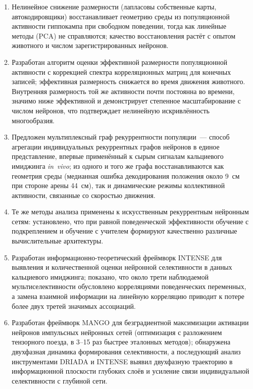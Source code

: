 \begin{enumerate}
  \item Нелинейное снижение размерности (лапласовы собственные карты, автокодировщики) восстанавливает геометрию среды из популяционной активности гиппокампа при свободном поведении, тогда как линейные методы (PCA) не справляются; качество восстановления растёт с опытом животного и числом зарегистрированных нейронов.

  \item Разработан алгоритм оценки эффективной размерности популяционной активности с коррекцией спектра корреляционных матриц для конечных записей; эффективная размерность снижается во время движения животного. Внутренняя размерность той же активности почти постоянна во времени, значимо ниже эффективной и демонстрирует степенное масштабирование с числом нейронов, что подтверждает нелинейную искривлённость многообразия.

  \item Предложен мультиплексный граф рекуррентности популяции~--- способ агрегации индивидуальных рекуррентных графов нейронов в единое представление, впервые применённый к сырым сигналам кальциевого имиджинга \textit{in~vivo}; из одного и того же графа восстанавливаются как геометрия среды (медианная ошибка декодирования положения около 9~см при стороне арены 44~см), так и динамические режимы коллективной активности, связанные со скоростью движения.

  \item Те же методы анализа применены к искусственным рекуррентным нейронным сетям: установлено, что при равной поведенческой эффективности обучение с подкреплением и обучение с учителем формируют качественно различные вычислительные архитектуры.

  \item Разработан информационно-теоретический фреймворк INTENSE для выявления и количественной оценки нейронной селективности в данных кальциевого имиджинга; показано, что около трети наблюдаемой мультиселективности обусловлено корреляциями поведенческих переменных, а замена взаимной информации на линейную корреляцию приводит к потере более двух третей значимых ассоциаций.

  \item Разработан фреймворк MANGO для безградиентной максимизации активации нейронов импульсных нейронных сетей (оптимизация с разложением тензорного поезда, в 3--15 раз быстрее эталонных методов); обнаружена двухфазная динамика формирования селективности, а последующий анализ инструментами DRIADA и INTENSE выявил двухфазную траекторию в информационной плоскости глубоких слоёв и усиление связи индивидуальной селективности с глубиной сети.


\end{enumerate}
